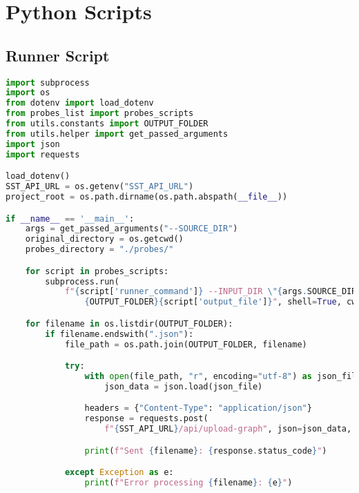 \chapter{Python Scripts}\label{appendix_b}

\section{Runner Script}\label{appendix_sec:py_runner_script}
\begin{lstlisting}[language=Python]
import subprocess
import os
from dotenv import load_dotenv
from probes_list import probes_scripts
from utils.constants import OUTPUT_FOLDER
from utils.helper import get_passed_arguments
import json
import requests

load_dotenv()
SST_API_URL = os.getenv("SST_API_URL")
project_root = os.path.dirname(os.path.abspath(__file__))

if __name__ == '__main__':
    args = get_passed_arguments("--SOURCE_DIR")
    original_directory = os.getcwd()
    probes_directory = "./probes/"

    for script in probes_scripts:
        subprocess.run(
            f"{script['runner_command']} --INPUT_DIR \"{args.SOURCE_DIR}\" --OUTPUT \
                {OUTPUT_FOLDER}{script['output_file']}", shell=True, cwd=project_root)

    for filename in os.listdir(OUTPUT_FOLDER):
        if filename.endswith(".json"):
            file_path = os.path.join(OUTPUT_FOLDER, filename)

            try:
                with open(file_path, "r", encoding="utf-8") as json_file:
                    json_data = json.load(json_file)

                headers = {"Content-Type": "application/json"}
                response = requests.post(
                    f"{SST_API_URL}/api/upload-graph", json=json_data, headers=headers)

                print(f"Sent {filename}: {response.status_code}")

            except Exception as e:
                print(f"Error processing {filename}: {e}")
\end{lstlisting}